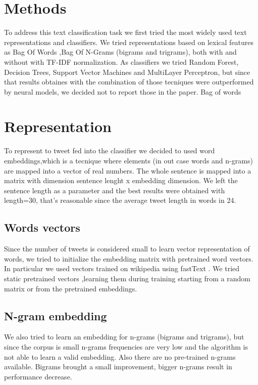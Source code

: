 \section{Methods} \label{sec:methods}
To address this text classification task we first tried the most widely used text representations and classifiers.
We tried representations based on lexical features as Bag Of Words \cite{harris1954distributional},Bag Of N-Grams (bigrams and trigrams), both with and without with TF-IDF normalization.
As classifiers we tried Random Forest, Decision Trees, Support Vector Machines and MultiLayer Perceptron, but since that results obtaines with the combination of those tecniques were outperformed by neural models, we decided not to report those in the paper.
Bag of words

\section{Representation}
To represent to tweet fed into the classifier we decided to used word embeddings,which is a tecnique where elements (in out case words and n-grams) are mapped into a vector of real numbers.
The whole sentence is mapped into a matrix with dimension sentence lenght x embedding dimension.
We left the sentence length as a parameter and the best results were obtained with length=30, that's reasonable since the average tweet length in words in 24.

\subsection{Words vectors}
Since the number of tweets is considered small to learn vector representation of words, we tried to initialize the embedding matrix with pretrained word vectors.
In particular we used vectors trained on wikipedia using fastText \cite{bojanowski2016enriching}.
We tried static pretrained vectors ,learning them during training starting from a random matrix or from the pretrained embeddings.

\subsection{N-gram embedding}
We also tried to learn an embedding for n-grams (bigrams and trigrams), but since the corpus is small n-grams frequencies are very low and the algorithm is not able to learn a valid embedding.
Also there are no pre-trained n-grams available.
Bigrams brought a small improvement, bigger n-grams result in performance decrease.



